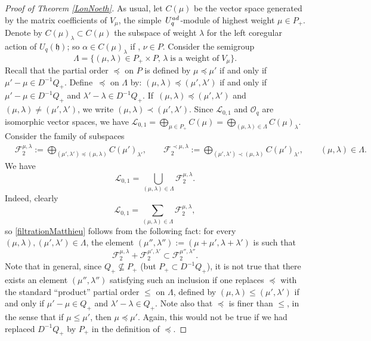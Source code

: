\documentclass[11pt]{article}
\numberwithin{equation}{section}
\numberwithin{equation}{section}
\theoremstyle{definition}
\begin{document}
\begin{proof}[Proof of Theorem \ref{LonNoeth}]
As usual, let $C(\mu)$ be the vector space generated by the matrix coefficients of $V_\mu$, the simple~$U_q^{\rm ad}$-module of highest weight $\mu \in P_+$. Denote by $C(\mu)_\lambda \subset C(\mu)$ the subspace of weight $\lambda$ for the left coregular action of $U_q({\mathfrak h})$; so $\alpha\in C(\mu)_\lambda$ if , $\nu\in P$. Consider the semigroup
\[\Lambda=\{(\mu, \lambda)\in P_+\times P, \, \lambda \;\text{is a weight of}\;V_\mu\}.\]
Recall that the partial order $\preceq$ on $P$ is defined by $\mu\preceq \mu'$ if and only if $\mu'-\mu\in D^{-1}Q_+$. Define~$\preceq$ on $\Lambda$ by: $(\mu,\lambda)\preceq (\mu', \lambda')$ if and only if $\mu'-\mu\in D^{-1}Q_+$ and $\lambda'-\lambda\in D^{-1}Q_+$. If~${(\mu,\lambda)\preceq (\mu', \lambda')}$ and $(\mu,\lambda)\ne (\mu', \lambda')$, we write $(\mu,\lambda)\prec (\mu', \lambda')$. Since ${\mathcal L}_{0,1}$ and ${\mathcal O}_q$ are isomorphic vector spaces, we have $ {\mathcal L}_{0,1}=\bigoplus_{\mu\in P_+} C(\mu)=\bigoplus_{(\mu,\lambda)\in \Lambda} C(\mu)_\lambda$. Consider the family of subspaces
\begin{align*}
& {\mathcal F}_2^{\mu,\lambda} :=\bigoplus_{(\mu',\lambda')\preceq (\mu,\lambda)} C(\mu')_{\lambda'} , \qquad{\mathcal F}_2^{\prec \mu,\lambda}:=\bigoplus_{(\mu',\lambda')\prec (\mu,\lambda)} C(\mu')_{\lambda'} , \qquad (\mu,\lambda)\in \Lambda.
\end{align*}
We have
\begin{equation}\label{filtrationMatthieu}
{\mathcal L}_{0,1} = \bigcup_{(\mu,\lambda)\in \Lambda} {\mathcal F}_2^{\mu,\lambda}.
\end{equation}
Indeed, clearly
\[ {\mathcal L}_{0,1} = \sum_{(\mu,\lambda)\in \Lambda} {\mathcal F}_2^{\mu,\lambda},
\]
 so \eqref{filtrationMatthieu} follows from the following fact: for every $(\mu,\lambda), (\mu',\lambda')\in \Lambda$, the element $(\mu'',\lambda''):= (\mu+\mu',\lambda+\lambda')$ is such that
\[{\mathcal F}_2^{\mu,\lambda}+ {\mathcal F}_2^{\mu',\lambda'} \subset {\mathcal F}_2^{\mu'',\lambda''}.\]
Note that in general, since $Q_+\nsubseteq P_+$ (but $P_+\subset D^{-1}Q_+$), it is not true that there exists an element $(\mu'',\lambda'')$ satisfying such an inclusion if one replaces $\preceq$ with the standard ``product'' partial order $\leq$ on $\Lambda$, defined by $(\mu,\lambda)\leq (\mu', \lambda')$ if and only if $\mu'-\mu\in Q_+$ and $\lambda'-\lambda\in Q_+$. Note also that $\preceq$ is finer than $\leq$, in the sense that if $\mu \leq \mu'$, then $\mu\preceq \mu'$. Again, this would not be true if we had replaced $D^{-1}Q_+$ by $P_+$ in the definition of $\preceq$.


\end{proof}
\end{document}
